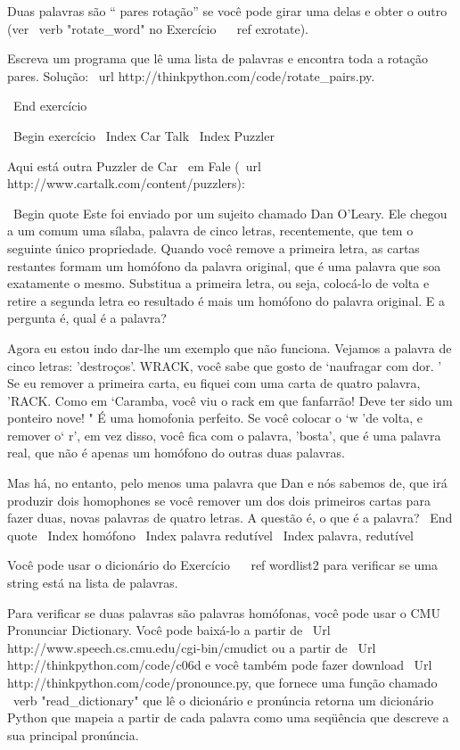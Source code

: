 \documentclass[10pt]{book}
\begin{document}
\begin {itemize}
{{{{{{{Duas palavras são `` pares rotação'' se você pode girar uma delas
e obter o outro (ver \ verb "rotate_word" no Exercício ~ \ ref {exrotate}).

Escreva um programa que lê uma lista de palavras e encontra toda a rotação
pares. Solução: \ url {http://thinkpython.com/code/rotate_pairs.py}.

\ End {} exercício


\ Begin {} exercício
\ Index {Car Talk}
\ Index {} Puzzler

Aqui está outra Puzzler de {Car \ em
Fale} (\ url {http://www.cartalk.com/content/puzzlers}):

\ Begin {quote}
Este foi enviado por um sujeito chamado Dan O'Leary. Ele chegou a um comum
uma sílaba, palavra de cinco letras, recentemente, que tem o seguinte único
propriedade. Quando você remove a primeira letra, as cartas restantes formam
um homófono da palavra original, que é uma palavra que soa exatamente
o mesmo. Substitua a primeira letra, ou seja, colocá-lo de volta e retire
a segunda letra eo resultado é mais um homófono do
palavra original. E a pergunta é, qual é a palavra?

Agora eu estou indo dar-lhe um exemplo que não funciona. Vejamos
a palavra de cinco letras: 'destroços'. WRACK, você sabe que gosto de `naufragar com
dor. ' Se eu remover a primeira carta, eu fiquei com uma carta de quatro
palavra, 'RACK. Como em `Caramba, você viu o rack em que fanfarrão!
Deve ter sido um ponteiro nove! " É uma homofonia perfeito. Se você
colocar o `w 'de volta, e remover o` r', em vez disso, você fica com o
palavra, 'bosta', que é uma palavra real, que não é apenas um homófono do
outras duas palavras.

Mas há, no entanto, pelo menos uma palavra que Dan e nós sabemos de,
que irá produzir dois homophones se você remover um dos dois primeiros
cartas para fazer duas, novas palavras de quatro letras. A questão é, o que é
a palavra?
\ End {quote}
\ Index {} homófono
\ Index {palavra redutível}
\ Index {palavra, redutível}

Você pode usar o dicionário do Exercício ~ \ ref {} wordlist2 para verificar
se uma string está na lista de palavras.

Para verificar se duas palavras são palavras homófonas, você pode usar o CMU
Pronunciar Dictionary. Você pode baixá-lo a partir de
\ Url {http://www.speech.cs.cmu.edu/cgi-bin/cmudict} ou a partir de
\ Url {http://thinkpython.com/code/c06d} e você também pode fazer download
\ Url {http://thinkpython.com/code/pronounce.py}, que fornece uma função
chamado \ verb "read_dictionary" que lê o dicionário e pronúncia
retorna um dicionário Python que mapeia a partir de cada palavra como uma seqüência que
descreve a sua principal pronúncia.

}}}}}}}
\end{itemize}
\end{document}
